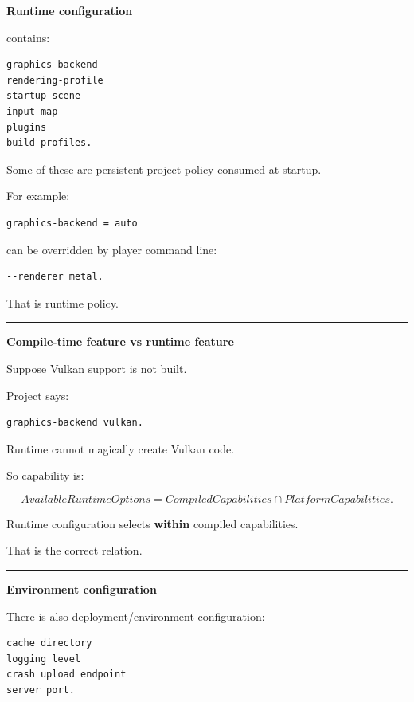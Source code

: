 \textbf{Runtime configuration}

 contains:

\begin{verbatim}
graphics-backend
rendering-profile
startup-scene
input-map
plugins
build profiles.
\end{verbatim}

Some of these are persistent project policy consumed at startup.

For example:

\begin{verbatim}
graphics-backend = auto
\end{verbatim}

can be overridden by player command line:

\begin{verbatim}
--renderer metal.
\end{verbatim}

That is runtime policy.

\begin{center}\rule{0.5\linewidth}{0.5pt}\end{center}

\textbf{Compile-time feature vs runtime feature}

Suppose Vulkan support is not built.

Project says:

\begin{verbatim}
graphics-backend vulkan.
\end{verbatim}

Runtime cannot magically create Vulkan code.

So capability is:

\[
AvailableRuntimeOptions
=
CompiledCapabilities
\cap
PlatformCapabilities.
\]

Runtime configuration selects \textbf{within} compiled capabilities.

That is the correct relation.

\begin{center}\rule{0.5\linewidth}{0.5pt}\end{center}

\textbf{Environment configuration}

There is also deployment/environment configuration:

\begin{verbatim}
cache directory
logging level
crash upload endpoint
server port.
\end{verbatim}

